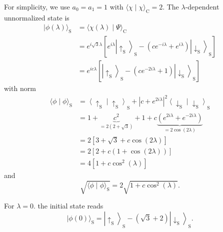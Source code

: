 For simplicity, we use $a_0=a_1=1$ with $\langle\chi \mid \chi\rangle_{\mathrm{C}}=2$. The $\lambda$-dependent unnormalized state is
\begin{equation}
\begin{aligned}
|\phi(\lambda)\rangle_{\mathrm{S}} & =\langle\chi(\lambda) \mid \Psi\rangle_{\mathrm{C}} \\
& =e^{i \sqrt{3} \lambda}\left[e^{i \lambda}\left|\uparrow_{\mathrm{S}}\right\rangle_{\mathrm{S}}-\left(c e^{-i \lambda}+e^{i \lambda}\right)\left|\downarrow_{\mathrm{S}}\right\rangle_{\mathrm{S}}\right] \\
& =e^{i c \lambda}\left[\left|\uparrow_{\mathrm{S}}\right\rangle_{\mathrm{S}}-\left(c e^{-2 i \lambda}+1\right)\left|\downarrow_{\mathrm{S}}\right\rangle_{\mathrm{S}}\right]
\end{aligned}
\end{equation}
with norm
\begin{equation}
\begin{aligned}
\langle\phi \mid \phi\rangle_{\mathrm{S}} & =\left\langle\uparrow_{\mathrm{S}} \mid \uparrow_{\mathrm{S}}\right\rangle_{\mathrm{S}}+\left|c+e^{2 i \lambda}\right|^2\left\langle\downarrow_{\mathrm{S}} \mid \downarrow_{\mathrm{S}}\right\rangle_{\mathrm{S}} \\
& =1+\underbrace{c^2}_{=2(2+\sqrt{3})}+1+c \underbrace{\left(e^{2 i \lambda}+e^{-2 i \lambda}\right)}_{=2 \cos (2 \lambda)} \\
& =2[3+\sqrt{3}+c \cos (2 \lambda)] \\
& =2[2+c(1+\cos (2 \lambda))] \\
& =4\left[1+c \cos ^2(\lambda)\right]
\end{aligned}
\end{equation}
and
\begin{equation}
\sqrt{\langle\phi \mid \phi\rangle_{\mathrm{S}}}=2 \sqrt{1+c \cos ^2(\lambda)} .
\end{equation}

For $\lambda=0$. the initial state reads
\begin{equation}
|\phi(0)\rangle_{\mathrm{S}}=\left|\uparrow_{\mathrm{S}}\right\rangle_{\mathrm{S}}-(\sqrt{3}+2)\left|\downarrow_{\mathrm{S}}\right\rangle_{\mathrm{S}} .
\end{equation}

